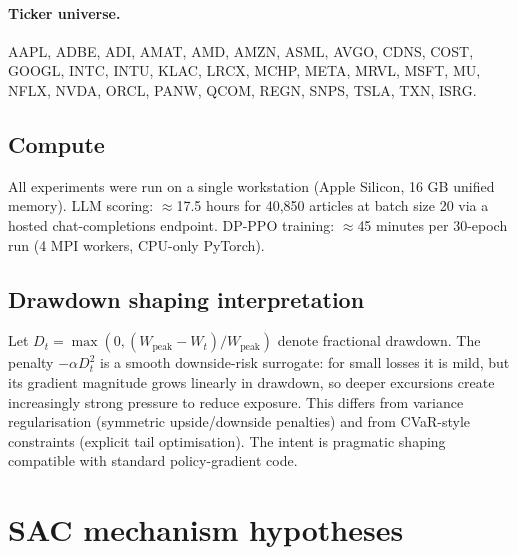 \documentclass{article}
\begin{document}
\paragraph{Ticker universe.}
\label{app:tickers}
AAPL, ADBE, ADI, AMAT, AMD, AMZN, ASML, AVGO, CDNS, COST, GOOGL,
INTC, INTU, KLAC, LRCX, MCHP, META, MRVL, MSFT, MU, NFLX, NVDA,
ORCL, PANW, QCOM, REGN, SNPS, TSLA, TXN, ISRG.

\subsection{Compute}

All experiments were run on a single workstation (Apple Silicon,
16 GB unified memory).
LLM scoring: $\approx$17.5 hours for 40,850 articles at batch size 20
via a hosted chat-completions endpoint.
DP-PPO training: $\approx$45 minutes per 30-epoch run (4 MPI workers,
CPU-only PyTorch).

\subsection{Drawdown shaping interpretation}
\label{app:dppo_interp}

Let $D_t=\max(0,(W_\text{peak}-W_t)/W_\text{peak})$ denote fractional drawdown.
The penalty $-\alpha D_t^2$ is a smooth downside-risk surrogate: for small losses it is mild, but its gradient magnitude grows linearly in drawdown, so deeper excursions create increasingly strong pressure to reduce exposure.
This differs from variance regularisation (symmetric upside/downside penalties) and from CVaR-style constraints (explicit tail optimisation).
The intent is pragmatic shaping compatible with standard policy-gradient code.

\section{SAC mechanism hypotheses}
\label{app:sac_mechanism}
\end{document}
